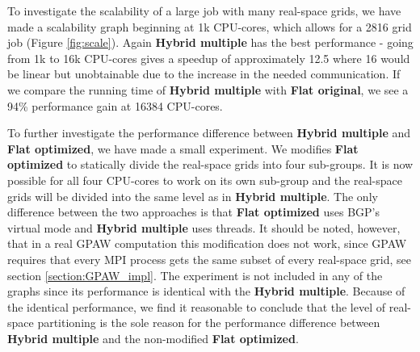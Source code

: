 \documentclass[preprint,3p,times,twocolumn]{elsarticle}
\begin{document}
To investigate the scalability of a large job with many real-space grids, we have made a scalability graph beginning at 1k CPU-cores, which allows for a 2816 grid job (Figure \ref{fig:scale}). Again \textbf{Hybrid multiple} has the best performance - going from 1k to 16k CPU-cores gives a speedup of approximately 12.5 where 16 would be linear but unobtainable due to the increase in the needed communication. If we compare the running time of \textbf{Hybrid multiple} with \textbf{Flat original}, we see a 94\% performance gain at 16384 CPU-cores.


To further investigate the performance difference between \textbf{Hybrid multiple} and \textbf{Flat optimized}, we have made a small experiment. We modifies \textbf{Flat optimized} to statically divide the real-space grids into four sub-groups. It is now possible for all four CPU-cores to work on its own sub-group and the real-space grids will be divided into the same level as in \textbf{Hybrid multiple}. The only difference between the two approaches is that \textbf{Flat optimized} uses BGP's virtual mode and \textbf{Hybrid multiple} uses threads.
It should be noted, however, that in a real GPAW computation this modification does not work, since GPAW requires that every MPI process gets the same subset of every real-space grid, see section \ref{section:GPAW_impl}.
The experiment is not included in any of the graphs since its performance is identical with the \textbf{Hybrid multiple}. Because of the identical performance, we find it reasonable to conclude that the level of real-space partitioning is the sole reason for the performance difference between \textbf{Hybrid multiple} and the non-modified \textbf{Flat optimized}.
\end{document}

